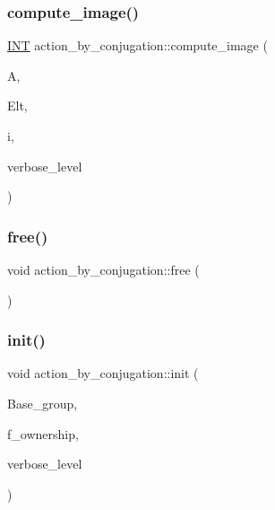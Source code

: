 \subsubsection{\texorpdfstring{compute\+\_\+image()}{compute\_image()}}
{\footnotesize\ttfamily \mbox{\hyperlink{galois_8h_a09fddde158a3a20bd2dcadb609de11dc}{I\+NT}} action\+\_\+by\+\_\+conjugation\+::compute\+\_\+image (\begin{DoxyParamCaption}\item[{\mbox{\hyperlink{classaction}{action}} $\ast$}]{A,  }\item[{\mbox{\hyperlink{galois_8h_a09fddde158a3a20bd2dcadb609de11dc}{I\+NT}} $\ast$}]{Elt,  }\item[{\mbox{\hyperlink{galois_8h_a09fddde158a3a20bd2dcadb609de11dc}{I\+NT}}}]{i,  }\item[{\mbox{\hyperlink{galois_8h_a09fddde158a3a20bd2dcadb609de11dc}{I\+NT}}}]{verbose\+\_\+level }\end{DoxyParamCaption})}

\mbox{\label{classaction__by__conjugation_a6a7deae7eb106313e5f49bef8f913cbd}} 
\subsubsection{\texorpdfstring{free()}{free()}}
{\footnotesize\ttfamily void action\+\_\+by\+\_\+conjugation\+::free (\begin{DoxyParamCaption}{ }\end{DoxyParamCaption})}

\mbox{\label{classaction__by__conjugation_abf94201a9e107f18dbc163ff58706e77}} 
\subsubsection{\texorpdfstring{init()}{init()}}
{\footnotesize\ttfamily void action\+\_\+by\+\_\+conjugation\+::init (\begin{DoxyParamCaption}\item[{\mbox{\hyperlink{classsims}{sims}} $\ast$}]{Base\+\_\+group,  }\item[{\mbox{\hyperlink{galois_8h_a09fddde158a3a20bd2dcadb609de11dc}{I\+NT}}}]{f\+\_\+ownership,  }\item[{\mbox{\hyperlink{galois_8h_a09fddde158a3a20bd2dcadb609de11dc}{I\+NT}}}]{verbose\+\_\+level }\end{DoxyParamCaption})}

